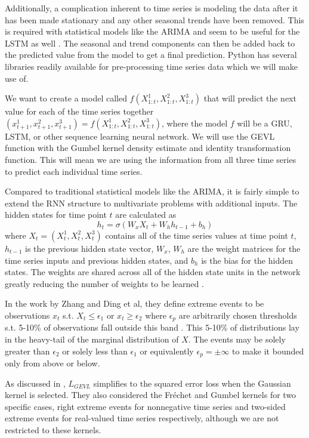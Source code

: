 \documentclass[conference]{IEEEtran}
\begin{document}
Additionally, a complication inherent to time series is modeling the data after it has been made stationary and any other seasonal trends have been removed. This is required with statistical models like the ARIMA and seem to be useful for the LSTM as well \cite{teamKerasDocumentationLSTM}. The seasonal and trend components can then be added back to the predicted value from the model to get a final prediction. Python has several libraries readily available for pre-processing time series data which we will make use of.


We want to create a model called $f(X^1_{1:t}, X^2_{1:t}, X^3_{1:t})$ that will predict the next value for each of the time series together $(x^1_{t+1}, x^2_{t+1}, x^3_{t+1}) = f(X^1_{1:t}, X^2_{1:t}, X^3_{1:t})$, where the model $f$ will be a GRU, LSTM, or other sequence learning neural network. We will use the GEVL function with the Gumbel kernel density estimate and identity transformation function. This will mean we are using the information from all three time series to predict each individual time series. 

Compared to traditional statistical models like the ARIMA, it is fairly simple to extend the RNN structure to multivariate problems with additional inputs. The hidden states for time point $t$ are calculated as $$h_t = \sigma(W_x X_t + W_h h_{t-1} + b_h)$$ where $X_t = (X^1_t, X^2_t, X^3_t)$ contains all of the time series values at time point $t$, $h_{t-1}$ is the previous hidden state vector, $W_x$, $W_h$ are the weight matrices for the time series inputs and previous hidden states, and $b_h$ is the bias for the hidden states. The weights are shared across all of the hidden state units in the network greatly reducing the number of weights to be learned \cite{choPropertiesNeuralMachine2014}.

In the work by Zhang and Ding et al, they define extreme events to be observations $x_t$ s.t. $X_t \leq \epsilon_1$ or $x_t \geq \epsilon_2$ where $\epsilon_p$ are arbitrarily chosen thresholds s.t. 5-10\% of observations fall outside this band \cite{zhangEnhancingTimeSeries2021, dingModelingExtremeEvents2019}. This 5-10\% of distributions lay in the heavy-tail of the marginal distribution of $X$. The events may be solely greater than $\epsilon_2$ or solely less than $\epsilon_1$ or equivalently $\epsilon_p = \pm \infty$ to make it bounded only from above or below.

As discussed in \cite{zhangEnhancingTimeSeries2021}, $L_{GEVL}$ simplifies to the squared error loss when the Gaussian kernel is selected. They also considered the Fr\'{e}chet and Gumbel kernels for two specific cases, right extreme events for nonnegative time series and two-sided extreme events for real-valued time series respectively, although we are not restricted to these kernels. 
\end{document}
